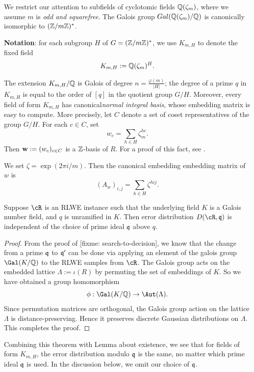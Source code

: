 \documentclass{amsart}
\begin{document}
We restrict our attention to subfields of cyclotomic fields $\mathbb{Q}(\zeta_m)$, where we assume $m$ is {\it odd and squarefree}. The Galois group $Gal(\mathbb{Q}(\zeta_m)/\mathbb{Q})$ is canonically isomorphic to $(\mathbb{Z}/m\mathbb{Z})^*$.

{\bf Notation}: for each subgroup $H$ of $G = (\mathbb{Z}/m\mathbb{Z})^*$, we use $K_{m,H}$ to denote the fixed field
\[
    K_{m,H} := \mathbb{Q}(\zeta_m)^H.
\]

The extension $K_{m,H}/\mathbb{Q}$ is Galois of degree $n = \frac{\varphi(m)}{|H|}$; the degree of a prime $q$ in $K_{m,H}$ is equal to the order of $[q]$ in the quotient group $G/H$. Moreover, every field of form $K_{m,H}$ has canonical{\it normal integral basis}, whose embedding matrix is easy to compute. More precisely, let $C$ denote a set of coset representatives of the group $G/H$. For each $c \in C$, set
\[
    w_c =  \sum_{h \in H} \zeta_m^{hc}.
\]
Then  ${\bf w} := (w_c)_{c \in C}$ is a $\mathbb{Z}$-basis of $R$. For a proof of this fact, see \cite[Proposition 6.1]{johnston2011notes}.

We set $\zeta = \exp(2\pi i /m)$. Then the canonical embedding embedding matrix of $w$ is
\[
    (A_w)_{i,j} = \sum_{h \in H}{\zeta^{hij}}.
\]

\begin{Lemma} \label{lem: symmetry}
Suppose $\cR$ is an RLWE instance such that the underlying field $K$ is a Galois number field, and $q$ is unramified in $K$. Then error distribution $D(\cR, \fq)$ is independent of the choice of prime ideal $\mathfrak{q}$ above $q$.
\end{Lemma}

\begin{proof}
From the proof of [fixme: search-to-decision], we know that the change from a prime $\mathfrak{q}$ to $\mathfrak{q}'$ can be done via applying an element of the galois group $\Gal(K/\bQ)$ to the RLWE samples from $\cR$. The Galois group acts on the embedded lattice $\Lambda := \iota(R)$ by permuting the set of embeddings of $K$. So we have obtained a group homomorphism $$\phi: \Gal(K/\bQ) \to \Aut(\Lambda).$$
Since permutation matrices are orthogonal, the Galois group action on the lattice $\Lambda$ is distance-preserving. Hence it preserves discrete Gaussian distributions on $\Lambda$. This completes the proof.
\end{proof}

Combining this theorem with Lemma about existence, we see that for fields of form $K_{m,H}$, the error distribution modulo $\mathfrak{q}$ is the same, no matter which prime ideal $\mathfrak{q}$ is used. In the discussion below, we omit our choice of $\mathfrak{q}$.
\end{document}
